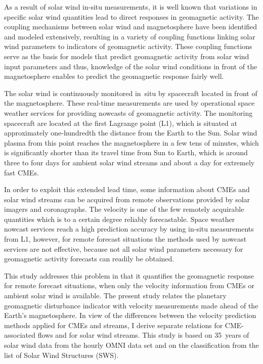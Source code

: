 As a result of solar wind in-situ measurements, it is well known that variations in specific solar wind quantities lead to direct responses in geomagnetic activity. The coupling mechanisms between solar wind and magnetosphere have been identified and modeled extensively, resulting in a variety of coupling functions linking solar wind parameters to indicators of geomagnetic activity. These coupling functions serve as the basis for models that predict geomagnetic activity from solar wind input parameters and thus, knowledge of the solar wind conditions in front of the magnetosphere enables to predict the geomagnetic response fairly well.

The solar wind is continuously monitored in~situ by spacecraft located in front of the magnetosphere. These real-time measurements are used by operational space weather services for providing nowcasts of geomagnetic activity. The monitoring spacecraft are located at the first Lagrange point (L1), which is situated at approximately one-hundredth the distance from the Earth to the Sun.
Solar wind plasma from this point reaches the magnetosphere in a few tens of minutes, which is significantly shorter than its  travel time from Sun to Earth, which is around three to four days for ambient solar wind streams and about a day for extremely fast CMEs.

In order to exploit this extended lead time, some information about CMEs and solar wind streams can be acquired from remote observations provided by solar imagers and coronagraphs. The velocity is one of the few remotely acquirable quantities which is to a certain degree reliably forecastable.
Space weather nowcast services reach a high prediction accuracy by using in-situ measurements from L1, however, for remote forecast situations the methods used by nowcast services are not effective, because not all solar wind parameters necessary for geomagnetic activity forecasts can readily be obtained.

This study addresses this problem in that it quantifies the geomagnetic response for remote forecast situations, when only the velocity information from CMEs or ambient solar wind is available.
The present study relates the planetary geomagnetic disturbance indicator \Kp{} with velocity measurements made ahead of the Earth's magnetosphere. In view of the differences between the velocity prediction methods applied for CMEs and streams, I derive separate relations for CME-associated flows and for solar wind streams. This study is based on 35~years of solar wind data from the hourly OMNI data set and on the classification from the list of Solar Wind Structures (SWS).

